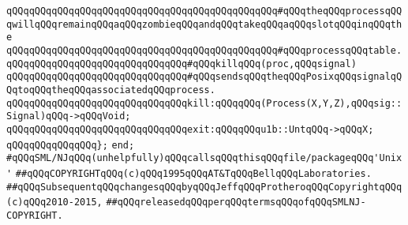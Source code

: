 \verb|qQQqqQQqqQQqqQQqqQQqqQQqqQQqqQQqqQQqqQQqqQQqqQQq#qQQqtheqQQqprocessqQQqwillqQQqremainqQQqaqQQqzombieqQQqandqQQqtakeqQQqaqQQqslotqQQqinqQQqthe|\newline
\verb|qQQqqQQqqQQqqQQqqQQqqQQqqQQqqQQqqQQqqQQqqQQqqQQq#qQQqprocessqQQqtable.|\newline
\newline
\verb|qQQqqQQqqQQqqQQqqQQqqQQqqQQqqQQq#qQQqkillqQQq(proc,qQQqsignal)|\newline
\verb|qQQqqQQqqQQqqQQqqQQqqQQqqQQqqQQq#qQQqsendsqQQqtheqQQqPosixqQQqsignalqQQqtoqQQqtheqQQqassociatedqQQqprocess.|\newline
\newline
\verb|qQQqqQQqqQQqqQQqqQQqqQQqqQQqqQQqkill:qQQqqQQq(Process(X,Y,Z),qQQqsig::Signal)qQQq->qQQqVoid;|\newline
\newline
\verb|qQQqqQQqqQQqqQQqqQQqqQQqqQQqqQQqexit:qQQqqQQqu1b::UntqQQq->qQQqX;|\newline
\verb|qQQqqQQqqQQqqQQq};|\newline
\verb|end;|\newline
\newline
\verb|#qQQqSML/NJqQQq(unhelpfully)qQQqcallsqQQqthisqQQqfile/packageqQQq'Unix'|\newline
\newline
\newline
\verb|##qQQqCOPYRIGHTqQQq(c)qQQq1995qQQqAT&TqQQqBellqQQqLaboratories.|\newline
\verb|##qQQqSubsequentqQQqchangesqQQqbyqQQqJeffqQQqProtheroqQQqCopyrightqQQq(c)qQQq2010-2015,|\newline
\verb|##qQQqreleasedqQQqperqQQqtermsqQQqofqQQqSMLNJ-COPYRIGHT.|\newline

